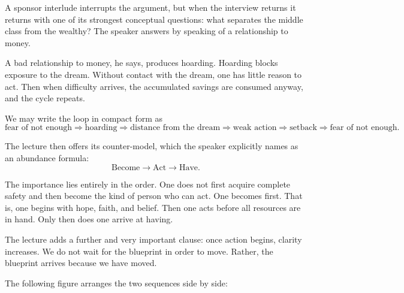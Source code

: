 A sponsor interlude interrupts the argument, but when the interview returns it returns with one of its strongest conceptual questions: what separates the middle class from the wealthy? The speaker answers by speaking of a relationship to money.

A bad relationship to money, he says, produces hoarding. Hoarding blocks exposure to the dream. Without contact with the dream, one has little reason to act. Then when difficulty arrives, the accumulated savings are consumed anyway, and the cycle repeats.

We may write the loop in compact form as
\begin{equation}
\text{fear of not enough}
\Longrightarrow
\text{hoarding}
\Longrightarrow
\text{distance from the dream}
\Longrightarrow
\text{weak action}
\Longrightarrow
\text{setback}
\Longrightarrow
\text{fear of not enough}.
\end{equation}

The lecture then offers its counter-model, which the speaker explicitly names as an abundance formula:
\begin{equation}
\text{Become} \to \text{Act} \to \text{Have}.
\end{equation}

The importance lies entirely in the order. One does not first acquire complete safety and then become the kind of person who can act. One becomes first. That is, one begins with hope, faith, and belief. Then one acts before all resources are in hand. Only then does one arrive at having.

The lecture adds a further and very important clause: once action begins, clarity increases. We do not wait for the blueprint in order to move. Rather, the blueprint arrives because we have moved.

The following figure arranges the two sequences side by side:

\begin{figure}
\centering
{}
\end{figure}

